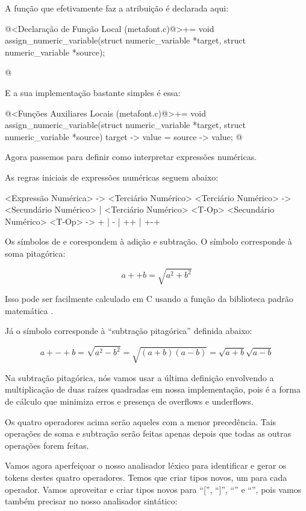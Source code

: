 A função que efetivamente faz a atribuição é declarada aqui:

\iniciocodigo
@<Declaração de Função Local (metafont.c)@>+=
void assign_numeric_variable(struct numeric_variable *target,
                            struct numeric_variable *source);

@
\fimcodigo

E a sua implementação bastante simples é essa:

\iniciocodigo
@<Funções Auxiliares Locais (metafont.c)@>+=
void assign_numeric_variable(struct numeric_variable *target,
                            struct numeric_variable *source){
  target -> value = source -> value;
}
@
\fimcodigo

Agora passemos para definir como interpretar expressões numéricas.


As regras iniciais de expressões numéricas seguem abaixo:

\alinhaverbatim
<Expressão Numérica> -> <Terciário Numérico>
<Terciário Numérico> -> <Secundário Numérico> |
                        <Terciário Numérico> <T-Op> <Secundário Numérico>
<T-Op> -> + | - | ++ | +-+
\alinhanormal

Os símbolos de \monoespaco{+} e \monoespaco{-} corespondem à adição e
subtração. O símbolo \monoespaco{++} corresponde à soma pitagórica:

$$
a ++ b = \sqrt{a^2 + b^2}
$$

Isso pode ser facilmente calculado em C usando a função da biblioteca
padrão matemática .

Já o símbolo \monoespaco{+-+} corresponde à ``subtração pitagórica''
definida abaixo:

$$
a +-+ b = \sqrt{a^2 - b^2} = \sqrt{(a+b)(a-b)} = \sqrt{a+b}\sqrt{a-b}
$$

Na subtração pitagórica, nós vamos usar a última definição envolvendo
a multiplicação de duas raízes quadradas em nossa implementação, pois
é a forma de cálculo que minimiza erros e presença de overflows e
underflows.

Os quatro operadores acima serão aqueles com a menor precedência. Tais
operações de soma e subtração serão feitas apenas depois que todas as
outras operações forem feitas.

Vamos agora aperfeiçoar o nosso analisador léxico para identificar e
gerar os tokens destes quatro operadores. Temos que criar tipos novos,
um para cada operador. Vamos aproveitar e criar tipos novos para
``['', ``]'', ``{'' e ``}'', pois vamos também precisar no nosso
analisador sintático:

